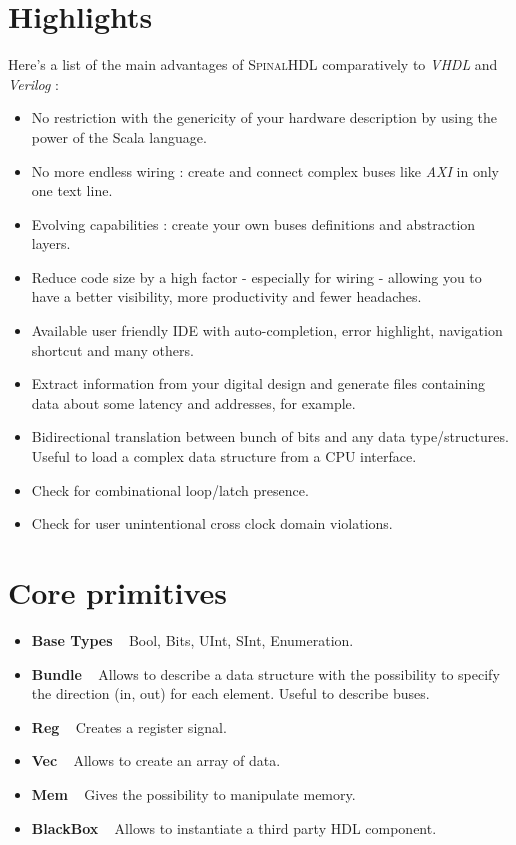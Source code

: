 \documentclass[10pt,twocolumn]{article}
\begin{document}
	\section{Highlights}
		Here's a list of the main advantages of \textsc{SpinalHDL} comparatively to \textit{VHDL} and \textit{Verilog} :
		\begin{itemize}[itemsep=0ex,label=$\textendash$]
			\item No restriction with the genericity of your hardware description by using the power of the Scala language.
			\item No more endless wiring : create and connect complex buses like \textit{AXI} in only one text line.
			\item Evolving capabilities : create your own buses definitions and abstraction layers.
			\item Reduce code size by a high factor - especially for wiring - allowing you to have a better visibility, more productivity and fewer headaches.
			\item Available user friendly IDE with auto-completion, error highlight, navigation shortcut and many others.
			\item Extract information from your digital design and generate files containing data about some latency and addresses, for example.
			\item Bidirectional translation between bunch of bits and any data type/structures. Useful to load a complex data structure from a CPU interface.
			\item Check for combinational loop/latch presence.
			\item Check for user unintentional cross clock domain violations.
		\end{itemize}
	
	\section{Core primitives}
		\begin{itemize}[itemsep=0ex,label=$\textendash$]
			\item \textbf{Base Types} ~ Bool, Bits, UInt, SInt, Enumeration.
			\item \textbf{Bundle} ~ Allows to describe a data structure with the possibility to specify the direction (in, out) for each element. Useful to describe buses.
			\item \textbf{Reg} ~ Creates a register signal.
			\item \textbf{Vec} ~ Allows to create an array of data.
			\item \textbf{Mem} ~ Gives the possibility to manipulate memory.
			\item \textbf{BlackBox} ~ Allows to instantiate a third party HDL component.
		\end{itemize}
	
\end{document}
